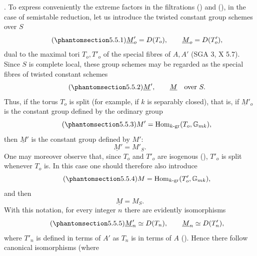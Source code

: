 \par\medskip
\noindent
{}. To express conveniently the extreme factors in the filtrations
() and (), in the case of semistable reduction, let us
introduce the twisted constant group schemes over $S$
\begin{equation}\tag{\SGARefTarget{sga7.sga7i.eix.n5-5-1}{5.5.1}}
 \underline M'_o=D(T_o),\qquad \underline M_o=D(T'_o),
\end{equation}
dual to the maximal tori $T_o,T'_o$ of the special fibres of $A,A'$
(SGA 3, X 5.7). Since $S$ is complete local, these group schemes may
be regarded as the special fibres of twisted constant schemes
\begin{equation}\tag{\SGARefTarget{sga7.sga7i.eix.n5-5-2}{5.5.2}}
 \underline M',\qquad \underline M\quad\hbox{over }S.
\end{equation}
Thus, if the torus $T_o$ is split (for example, if $k$ is separably
closed), that is, if $\underline M'_o$ is the constant group defined
by the ordinary group
\begin{equation}\tag{\SGARefTarget{sga7.sga7i.eix.n5-5-3}{5.5.3}}
 M'=\operatorname{Hom}_{k\text{-}\mathrm{gr}}(T_o,\mathbb G_{mk}),
\end{equation}
then $\underline M'$ is the constant group defined by $M'$:
\begin{equation*}
 \underline M'=M'_S.
\end{equation*}
One may moreover observe that, since $T_o$ and $T'_o$ are isogenous
(), $T'_o$ is split whenever $T_o$ is. In this case one should
therefore also introduce
\begin{equation}\tag{\SGARefTarget{sga7.sga7i.eix.n5-5-4}{5.5.4}}
 M=\operatorname{Hom}_{k\text{-}\mathrm{gr}}(T'_o,\mathbb G_{mk}),
\end{equation}
and then
\begin{equation*}
 \underline M=M_S.
\end{equation*}
With this notation, for every integer $n$ there are evidently
isomorphisms
\begin{equation}\tag{\SGARefTarget{sga7.sga7i.eix.n5-5-5}{5.5.5}}
 \underline M'_n\simeq D(T_n),\qquad
 \underline M_n\simeq D(T'_n),
\end{equation}
where $T'_n$ is defined in terms of $A'$ as $T_n$ is in terms of $A$
(). Hence there follow canonical isomorphisms (where

